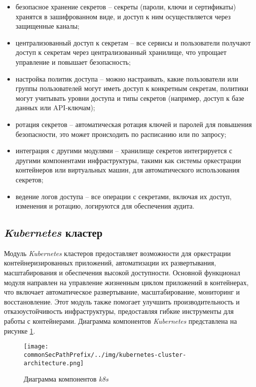\begin{itemize}
    \item безопасное хранение секретов -- секреты (пароли, ключи и сертификаты) хранятся в зашифрованном виде, и доступ к ним осуществляется через защищенные каналы; 
    \item централизованный доступ к секретам -- все сервисы и пользователи получают доступ к секретам через централизованный хранилище, что упрощает управление и повышает безопасность; 
    \item настройка политик доступа -- можно настраивать, какие пользователи или группы пользователей могут иметь доступ к конкретным секретам, политики могут учитывать уровни доступа и типы секретов (например, доступ к базе данных или API-ключам); 
    \item ротация секретов -- автоматическая ротация ключей и паролей для повышения безопасности, это может происходить по расписанию или по запросу; 
    \item интеграция с другими модулями -- хранилище секретов интегрируется с другими компонентами инфраструктуры, такими как системы оркестрации контейнеров или виртуальных машин, для автоматического использования секретов; 
    \item ведение логов доступа -- все операции с секретами, включая их доступ, изменения и ротацию, логируются для обеспечения аудита. 
\end{itemize}

\subsection{\textit{Kubernetes} кластер}
\label{sec:kubernetes_cluster_functionality}

Модуль \textit{Kubernetes} кластеров предоставляет возможности для оркестрации контейнеризированных приложений, автоматизации их развертывания, масштабирования и обеспечения высокой доступности. Основной функционал модуля направлен на управление жизненным циклом приложений в контейнерах, что включает автоматическое развертывание, масштабирование, мониторинг и восстановление. Этот модуль также помогает улучшить производительность и отказоустойчивость инфраструктуры, предоставляя гибкие инструменты для работы с контейнерами. Диаграмма компонентов \textit{Kubernetes} представлена на рисунке \ref{fig:kubernetes_cluster_functionality:k8s_components}.
\begin{figure}[ht]
    \centering
    \texttt{[image: \\commonSecPathPrefix/../img/kubernetes-cluster-architecture.png]}
    \caption{Диаграмма компонентов \textit{k8s}}
    \label{fig:kubernetes_cluster_functionality:k8s_components}
\end{figure}

